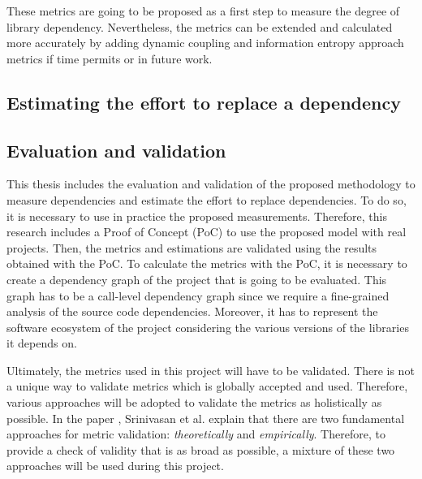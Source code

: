 These metrics are going to be proposed as a first step to measure the degree of library dependency. Nevertheless, the metrics can be extended and calculated more accurately by adding dynamic coupling and information entropy approach metrics if time permits or in future work.


\subsection{Estimating the effort to replace a dependency}

\begin{comment}
  In order to estimate the effort needed to replace a dependency in a project, there are different variables that need to be considered first:

  - How much code do I need to change - estimate based on the usage of the Dependency
  - Refactoring adjustment
  - How many methods do I need to change.
  - The impact of the change - inside the project.
\end{comment}

\subsection{Evaluation and validation} 
This thesis includes the evaluation and validation of the proposed methodology to measure dependencies and estimate the effort to replace dependencies. To do so, it is necessary to use in practice the proposed measurements. Therefore, this research includes a Proof of Concept (PoC) to use the proposed model with real projects. Then, the metrics and estimations are validated using the results obtained with the PoC.
To calculate the metrics with the PoC, it is necessary to create a dependency graph of the project that is going to be evaluated. This graph has to be a call-level dependency graph since we require a fine-grained analysis of the source code dependencies. Moreover, it has to represent the software ecosystem of the project considering the various versions of the libraries it depends on.

Ultimately, the metrics used in this project will have to be validated. There is not a unique way to validate metrics which is globally accepted and used. Therefore, various approaches will be adopted to validate the metrics as holistically as possible. In the paper \cite{srinivasan2014software}, Srinivasan et al. explain that there are two fundamental approaches for metric validation: \textit{theoretically} and \textit{empirically}. Therefore, to provide a check of validity that is as broad as possible, a mixture of these two approaches will be used during this project.


